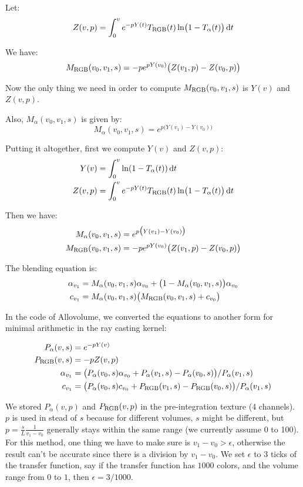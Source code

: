 \documentclass[letter, 11pt]{article}
\begin{document}
Let:
\begin{equation*}
Z(v, p) = \int_{0}^{v}{ e^{-p Y(t)} }T_{\mathrm{RGB}}(t) \ln\bigl(1-T_\alpha(t)\bigr) \, {\mathrm{d} t}
\end{equation*}

We have:
\begin{equation*}
M_{\mathrm{RGB}}(v_0, v_1, s) = -p e^{p Y(v_0)} \big(Z(v_1, p) - Z(v_0, p)\big)
\end{equation*}

Now the only thing we need in order to compute $M_{\mathrm{RGB}}(v_0, v_1, s)$ is $Y(v)$ and $Z(v, p)$.

Also, $M_\alpha(v_0, v_1, s)$ is given by:
\begin{equation*}
M_\alpha(v_0, v_1, s) = e^{p \big(Y(v_1)-Y(v_0)\big)}
\end{equation*}

Putting it altogether, first we compute $Y(v)$ and $Z(v, p)$:
\begin{align*}
Y(v) &= \int_0^v\ln(1 - T_\alpha(t)) \, \mathrm{d} t \\
Z(v, p) &= \int_{0}^{v}{ e^{-p Y(t)} }T_{\mathrm{RGB}}(t) \ln\bigl(1-T_\alpha(t)\bigr) \, {\mathrm{d} t}
\end{align*}

Then we have:
\begin{align*}
M_\alpha(v_0, v_1, s) &= e^{p \big(Y(v_1)-Y(v_0)\big)} \\
M_{\mathrm{RGB}}(v_0, v_1, s) &= -p e^{p Y(v_0)} \big(Z(v_1, p) - Z(v_0, p)\big)
\end{align*}

The blending equation is:
\begin{align*}
\alpha_{v_1} &= M_\alpha(v_0, v_1, s) \alpha_{v_0} + \bigl(1 - M_\alpha(v_0, v_1, s)\bigr) \alpha_{v_0} \label{eq:malpha2eliminate} \\
c_{v_1} &= M_\alpha(v_0, v_1, s) \big(M_{\mathrm{RGB}}(v_0, v_1, s) + c_{v_0}\big)
\end{align*}

In the code of Allovolume, we converted the equations to another form for minimal arithmetic in the ray casting kernel:

\begin{align*}
P_\alpha(v, s) &= e^{-p Y(v)} \\
P_{\mathrm{RGB}}(v, s) &= -p Z(v, p)\\
\alpha_{v_1} &= \big(P_\alpha(v_0,s) \alpha_{v_0} + P_\alpha(v_1,s) - P_\alpha(v_0,s)\big) / P_\alpha(v_1,s) \\
c_{v_1} &= \big(P_\alpha(v_0,s) c_{v_0} + P_{\mathrm{RGB}}(v_1,s) - P_{\mathrm{RGB}}(v_0,s)\big) / P_\alpha(v_1,s) \\
\end{align*}

We stored $P_\alpha(v,p)$ and $P_{\mathrm{RGB}}(v,p)$ in the pre-integration texture (4 channels). $p$ is used in stead of $s$ because
for different volumes, $s$ might be different, but $p = \frac{s}{L}\frac{1}{v_1 - v_0}$ generally stays within the same range (we currently assume 0 to 100).
For this method, one thing we have to make sure is $v_1 - v_0 > \epsilon$, otherwise the result can't be accurate since there is a division by $v_1 - v_0$.
We set $\epsilon$ to $3$ ticks of the transfer function, say if the transfer function has $1000$ colors, and the volume range from $0$ to $1$, then $\epsilon = 3 / 1000$.
\end{document}
